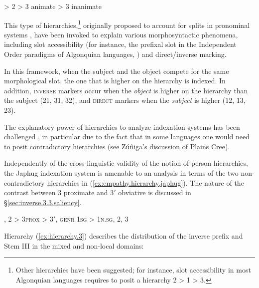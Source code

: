 \begin{exe}
\ex \label{ex:empathy.hierarchy}
 > 2 > 3 animate > 3 inanimate
\end{exe}

This type of hierarchies,\footnote{Other hierarchies have been suggested; for instance, slot accessibility in most Algonquian languages requires to posit a hierarchy 2 > 1 > 3. } originally proposed to account for splits in pronominal systems \citep{silverstein76}, have been invoked to explain various morphosyntactic phenomena, including slot accessibility (for instance, the prefixal slot in the Independent Order paradigms of Algonquian languages, \citealt{zuniga06, lockwood12hierarchies}) and direct/inverse marking.

In this framework, when the subject and the object compete for the same morphological slot, the one that is higher on the hierarchy is indexed. In addition, \textsc{inverse} markers occur when the \textit{object} is higher on the hierarchy than the subject (2\fl{}1, 3\fl{}1, 3\fl{}2), and \textsc{direct} markers when the \textit{subject} is higher (1\fl{}2, 1\fl{}3, 2\fl{}3). 

The explanatory power of hierarchies to analyze indexation systems has been challenged \citep{zuniga18hierarchies}, in particular due to the fact that in some languages one would need to posit contradictory hierarchies (see Zúñiga's \citeyear{zuniga06} discussion of Plains Cree).

Independently of the cross-linguistic validity of the notion of person hierarchies, the Japhug indexation system is amenable to an analysis in terms of the two non-contradictory hierarchies in (\ref{ex:empathy.hierarchy.japhug}). The nature of the contrast between 3 proximate and 3$'$ obviative is discussed in §\ref{sec:inverse.3.3.saliency}.

\begin{exe}
\ex \label{ex:empathy.hierarchy.japhug}
\begin{xlist}
\ex \label{ex:hierarchy.3}
, 2 > 3\textsc{prox} > 3$'$, \textsc{genr}
\ex \label{ex:hierarchy.1sg}
\glt \textsc{1sg} > 1\textsc{n}.\textsc{sg}, 2, 3
\end{xlist}
\end{exe}

Hierarchy (\ref{ex:hierarchy.3}) describes the distribution of the inverse  prefix and Stem III in the mixed and non-local domains: 

